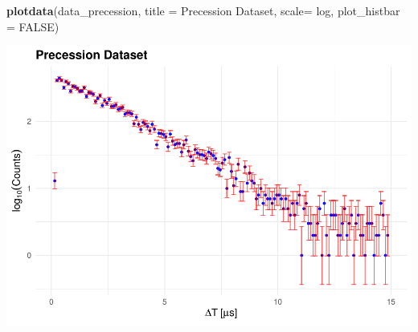 \documentclass[
]{article}
\newenvironment{Shaded}{\begin{snugshade}}{\end{snugshade}}
\newcommand{\AttributeTok}[1]{\textcolor[rgb]{0.13,0.29,0.53}{#1}}
\newcommand{\ConstantTok}[1]{\textcolor[rgb]{0.56,0.35,0.01}{#1}}
\newcommand{\FunctionTok}[1]{\textcolor[rgb]{0.13,0.29,0.53}{\textbf{#1}}}
\newcommand{\NormalTok}[1]{#1}
\newcommand{\StringTok}[1]{\textcolor[rgb]{0.31,0.60,0.02}{#1}}
\begin{document}
\begin{Shaded}
\begin{Highlighting}[]
\FunctionTok{plotdata}\NormalTok{(data\_precession, }\AttributeTok{title =} \StringTok{\textquotesingle{}Precession Dataset\textquotesingle{}}\NormalTok{, }\AttributeTok{scale=}  \StringTok{\textquotesingle{}log\textquotesingle{}}\NormalTok{, }\AttributeTok{plot\_histbar =} \ConstantTok{FALSE}\NormalTok{)}
\end{Highlighting}
\end{Shaded}

\includegraphics{BinnedAnalysis_files/figure-latex/unnamed-chunk-3-2.pdf}
\end{document}
